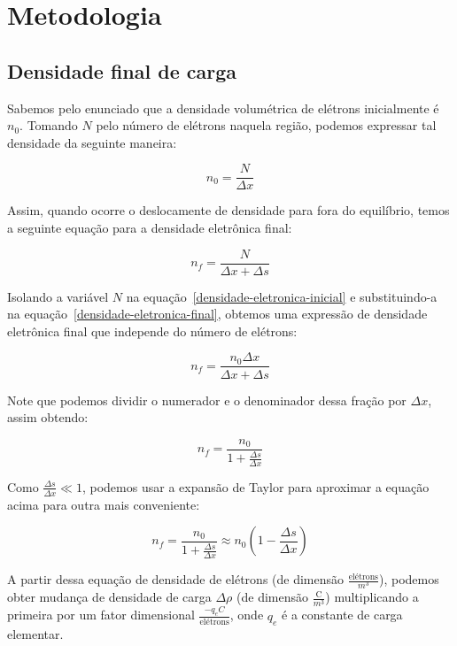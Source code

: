 \documentclass[
	article,
	11pt,
	oneside,
	a4paper,
	english,
	brazil,
	sumario=tradicional
	]{abntex2}
\begin{document}
\section{Metodologia}

\subsection{Densidade final de carga}
Sabemos pelo enunciado que a densidade volumétrica de elétrons inicialmente é $n_0$. Tomando $N$ pelo número de elétrons naquela região, podemos expressar tal densidade da seguinte maneira:

\begin{equation} \label{densidade-eletronica-inicial}
  n_0 = \frac{N}{\Delta x}
\end{equation}

Assim, quando ocorre o deslocamente de densidade para fora do equilíbrio, temos a seguinte equação para a densidade eletrônica final:

\begin{equation} \label{densidade-eletronica-final}
  n_f = \frac{N}{\Delta x + \Delta s}
\end{equation}

Isolando a variável $N$ na equação~\ref{densidade-eletronica-inicial} e substituindo-a na equação~\ref{densidade-eletronica-final}, obtemos uma expressão de densidade eletrônica final que independe do número de elétrons:

\begin{equation}
  n_f = \frac{n_0\Delta x}{\Delta x + \Delta s}
\end{equation}

Note que podemos dividir o numerador e o denominador dessa fração por $\Delta x$, assim obtendo:

\begin{equation}
  n_f = \frac{n_0}{1 + \frac{\Delta s}{\Delta x}}
\end{equation}

Como $\frac{\Delta s}{\Delta x} \ll 1$, podemos usar a expansão de Taylor para aproximar a equação acima para outra mais conveniente:

\begin{equation} \label{densidade-eletronica-taylor}
  n_f = \frac{n_0}{1 + \frac{\Delta s}{\Delta x}} \approx n_0(1 - \frac{\Delta s}{\Delta x})
\end{equation}

A partir dessa equação de densidade de elétrons (de dimensão $\frac{\textrm{elétrons}}{m^3}$), podemos obter mudança de densidade de carga $\Delta\rho$ (de dimensão $\frac{\textrm{C}}{m^3}$) multiplicando a primeira por um fator dimensional $\frac{- q_e C}{\textrm{elétrons}}$, onde $q_e$ é a constante de carga elementar.
\end{document}
